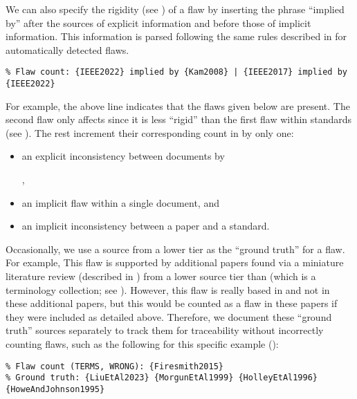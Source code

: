 We can also specify the rigidity (see ) of a flaw by inserting
the phrase ``implied by'' after the sources of explicit information and before
those of implicit information. This information is parsed following the same
rules described in  for automatically
detected flaws.
\begin{displayquote}
    \texttt{\% Flaw count: \{IEEE2022\} implied by \{Kam2008\} |
        \displayNL \{IEEE2017\} implied by \{IEEE2022\}}
\end{displayquote}
For example, the above line indicates that the flaws given below are
present. The second flaw only affects  since it
is less ``rigid'' than the first flaw within standards (see ).
The rest increment their corresponding count in
 by only one:
\begin{itemize}
    \item an explicit inconsistency between documents by
          \begin{NoHyper}\citeauthor{IEEE2022}\end{NoHyper},
    \item an implicit flaw within a single document, and
    \item an implicit inconsistency between a paper and a standard.
\end{itemize}

Occasionally, we use a source from a lower tier as the ``ground truth'' for a
flaw. For example, \tolTestFlaw*{} This flaw is supported
by additional papers found via a miniature literature review (described in
) from a lower source tier than \citep{Firesmith2015}
(which is a terminology collection; see ). However, this flaw
is really based in \citep{Firesmith2015} and not in these
additional papers, but this would be counted as a flaw in these papers if they
were included as detailed above. Therefore, we document these ``ground
truth'' sources separately to track them for traceability without incorrectly
counting flaws, such as the following for this specific example
():
\begin{displayquote}
    \texttt{\% Flaw count (TERMS, WRONG): \{Firesmith2015\}\\
        \% Ground truth: \{LiuEtAl2023\} \{MorgunEtAl1999\} \{HolleyEtAl1996\}
        \displayNL \{HoweAndJohnson1995\}}
\end{displayquote}


